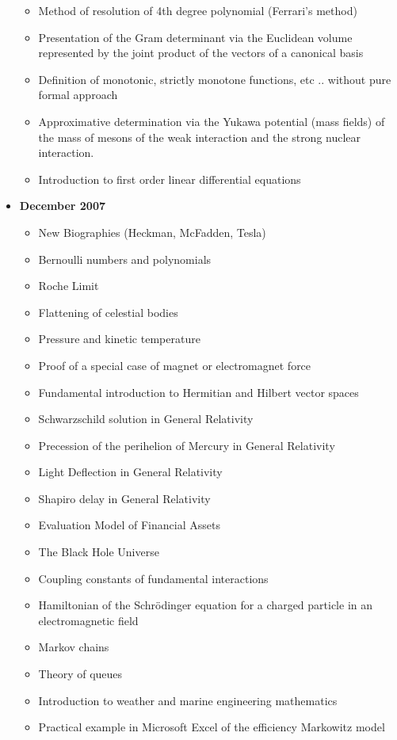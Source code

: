 \documentclass[12pt,a4paper,twoside,openright]{report}
\theoremstyle{definition}
\theoremstyle{itexmp}
\numberwithin{equation}{section}
\begin{document}
\begin{itemize}
\begin{itemize}[noitemsep]
			\item Method of resolution of 4th degree polynomial (Ferrari's method)
			\item Presentation of the Gram determinant via the Euclidean volume represented by the joint product of the vectors of a canonical basis
			\item Definition of monotonic, strictly monotone functions, etc .. without pure formal approach
			\item Approximative determination via the Yukawa potential (mass fields) of the mass of mesons of the weak interaction and the strong nuclear interaction.
			\item Introduction to first order linear differential equations			
		\end{itemize}
	\item \textbf{December 2007}
		\begin{itemize}[noitemsep]
			\item New Biographies (Heckman, McFadden, Tesla)
			\item Bernoulli numbers and polynomials
			\item Roche Limit
			\item Flattening of celestial bodies
			\item Pressure and kinetic temperature
			\item Proof of a special case of magnet or electromagnet force
			\item Fundamental introduction to Hermitian and Hilbert vector spaces 
			\item Schwarzschild solution in General Relativity
			\item Precession of the perihelion of Mercury in General Relativity
			\item Light Deflection in General Relativity
			\item Shapiro delay in General Relativity
			\item Evaluation Model of Financial Assets
			\item The Black Hole Universe
			\item Coupling constants of fundamental interactions
			\item Hamiltonian of the Schrödinger equation for a charged particle in an electromagnetic field
			\item Markov chains
			\item Theory of queues
			\item Introduction to weather and marine engineering mathematics
			\item Practical example in Microsoft Excel of the efficiency Markowitz model

\end{itemize}
\end{itemize}
\end{document}
